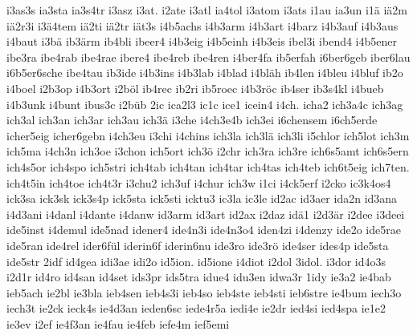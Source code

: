 {    i3as3s
    ia3sta
    ia3s4tr
    i3asz
    i3at.
    i2ate
    i3atl
    ia4tol
    i3atom
    i3ats
    i1au
    ia3un
    i1ä
    iä2m
    iä2r3i
    i3ä4tem
    iä2ti
    iä2tr
    iät3s
    i4b5achs
    i4b3arm
    i4b3art
    i4barz
    i4b3auf
    i4b3aus
    i4baut
    i3bä
    ib3ärm
    ib4bli
    ibeer4
    i4b3eig
    i4b5einh
    i4b3eis
    ibel3i
    ibend4
    i4b5ener
    ibe3ra
    ibe4rab
    ibe4rae
    ibere4
    ibe4reb
    ibe4ren
    i4ber4fa
    ib5erfah
    i6ber6geb
    iber6lau
    i6b5er6sche
    ibe4tau
    ib3ide
    i4b3ins
    i4b3lab
    i4blad
    i4bläh
    ib4len
    i4bleu
    i4bluf
    ib2o
    i4boel
    i2b3op
    i4b3ort
    i2böl
    ib4rec
    ib2ri
    ib5roec
    i4b3röc
    ib4ser
    ib3s4kl
    i4bueb
    i4b3unk
    i4bunt
    ibus3c
    i2büb
    2ic
    ica2l3
    ic1c
    ice1
    icein4
    i4ch.
    icha2
    ich3a4c
    ich3ag
    ich3al
    ich3an
    ich3ar
    ich3au
    ich3ä
    i3che
    i4ch3e4b
    ich3ei
    i6chensem
    i6ch5erde
    icher5eig
    icher6gebn
    i4ch3eu
    i3chi
    i4chins
    ich3la
    ich3lä
    ich3li
    i5chlor
    ich5lot
    ich3m
    ich5ma
    i4ch3n
    ich3oe
    i3chon
    ich5ort
    ich3ö
    i2chr
    ich3ra
    ich3re
    ich6s5amt
    ich6s5ern
    ich4s5or
    ich4spo
    ich5stri
    ich4tab
    ich4tan
    ich4tar
    ich4tas
    ich4teb
    ich6t5eig
    ich7ten.
    ich4t5in
    ich4toe
    ich4t3r
    i3chu2
    ich3uf
    i4chur
    ich3w
    i1ci
    i4ck5erf
    i2cko
    ic3k4os4
    ick3sa
    ick3sk
    ick3s4p
    ick5sta
    ick5sti
    icktu3
    ic3la
    ic3le
    id2ac
    id3aer
    ida2n
    id3ana
    i4d3ani
    i4danl
    i4dante
    i4danw
    id3arm
    id3art
    id2ax
    i2daz
    idä1
    i2d3är
    i2dee
    i3deei
    ide5inst
    i4demul
    ide5nad
    idener4
    ide4n3i
    ide4n3o4
    iden4zi
    i4denzy
    ide2o
    ide5rae
    ide5ran
    ide4rel
    ider6fül
    iderin6f
    iderin6nu
    ide3ro
    ide3rö
    ide4ser
    ides4p
    ide5sta
    ide5str
    2idf
    id4gea
    idi3ae
    idi2o
    id5ion.
    id5ione
    i4diot
    i2dol
    3idol.
    i3dor
    id4o3s
    i2d1r
    id4ro
    id4san
    id4set
    ids3pr
    ids5tra
    idue4
    idu3en
    idwa3r
    1idy
    ie3a2
    ie4bab
    ieb5ach
    ie2bl
    ie3bla
    ieb4sen
    ieb4s3i
    ieb4so
    ieb4ste
    ieb4sti
    ieb6stre
    ie4bum
    iech3o
    iech3t
    ie2ck
    ieck4s
    ie4d3an
    ieden6sc
    iede4r5a
    iedi4e
    ie2dr
    ied4si
    ied4spa
    ie1e2
    ie3ev
    i2ef
    ie4f3an
    ie4fau
    ie4feb
    iefe4m
    ief5emi
}
